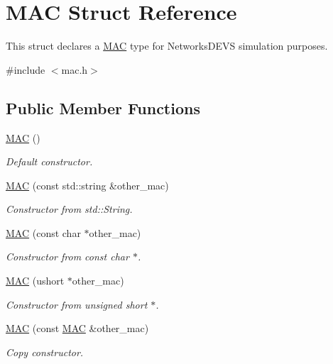 \hypertarget{structMAC}{}\section{M\+AC Struct Reference}
\label{structMAC}


This struct declares a \hyperlink{structMAC}{M\+AC} type for Networks\+D\+E\+VS simulation purposes.  




{\ttfamily \#include $<$mac.\+h$>$}

\subsection*{Public Member Functions}
\begin{DoxyCompactItemize}
\item 
\hyperlink{structMAC_a3fefccc59b40a218773b21b5280adb88}{M\+AC} ()
\begin{DoxyCompactList}\small\item\em Default constructor. \end{DoxyCompactList}\item 
\hyperlink{structMAC_ae2de91cf5744ce0232220d4f06943120}{M\+AC} (const std\+::string \&other\+\_\+mac)
\begin{DoxyCompactList}\small\item\em Constructor from std\+::\+String. \end{DoxyCompactList}\item 
\hyperlink{structMAC_a44b3c74ae71c8a4d25e2fe260087053c}{M\+AC} (const char $\ast$other\+\_\+mac)
\begin{DoxyCompactList}\small\item\em Constructor from const char $\ast$. \end{DoxyCompactList}\item 
\hyperlink{structMAC_a2d66b00eb9a189233549d2454932c321}{M\+AC} (ushort $\ast$other\+\_\+mac)
\begin{DoxyCompactList}\small\item\em Constructor from unsigned short $\ast$. \end{DoxyCompactList}\item 
\hyperlink{structMAC_a04498a5c27f36df601f83604da888f3e}{M\+AC} (const \hyperlink{structMAC}{M\+AC} \&other\+\_\+mac)
\begin{DoxyCompactList}\small\item\em Copy constructor. \end{DoxyCompactList}\item 

\end{DoxyCompactItemize}
